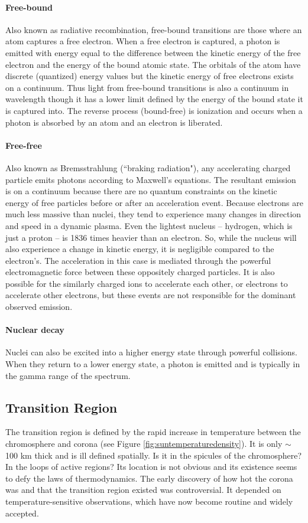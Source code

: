 \paragraph{Free-bound}
Also known as radiative recombination, free-bound transitions are those where an atom captures a free electron. When a free electron is captured, a photon is emitted with energy equal to the difference between the kinetic energy of the free electron and the energy of the bound atomic state. The orbitals of the atom have discrete (quantized) energy values but the kinetic energy of free electrons exists on a continuum. Thus light from free-bound transitions is also a continuum in wavelength though it has a lower limit defined by the energy of the bound state it is captured into. The reverse process (bound-free) is ionization and occurs when a photon is absorbed by an atom and an electron is liberated. 

\paragraph{Free-free}
Also known as Bremsstrahlung (``braking radiation"), any accelerating charged particle emits photons according to Maxwell's equations. The resultant emission is on a continuum because there are no quantum constraints on the kinetic energy of free particles before or after an acceleration event. Because electrons are much less massive than nuclei, they tend to experience many changes in direction and speed in a dynamic plasma. Even the lightest nucleus -- hydrogen, which is just a proton -- is 1836 times heavier than an electron. So, while the nucleus will also experience a change in kinetic energy, it is negligible compared to the electron's. The acceleration in this case is mediated through the powerful electromagnetic force between these oppositely charged particles. It is also possible for the similarly charged ions to accelerate each other, or electrons to accelerate other electrons, but these events are not responsible for the dominant observed emission. 

\paragraph{Nuclear decay}
Nuclei can also be excited into a higher energy state through powerful collisions. When they return to a lower energy state, a photon is emitted and is typically in the gamma range of the spectrum. 

\subsection{Transition Region}
The transition region is defined by the rapid increase in temperature between the chromosphere and corona (see Figure \ref{fig:suntemperaturedensity}). It is only $\sim$100 km thick and is ill defined spatially. Is it in the spicules of the chromosphere? In the loops of active regions? Its location is not obvious and its existence seems to defy the laws of thermodynamics. The early discovery of how hot the corona was and that the transition region existed was controversial. It depended on temperature-sensitive observations, which have now become routine and widely accepted. 

